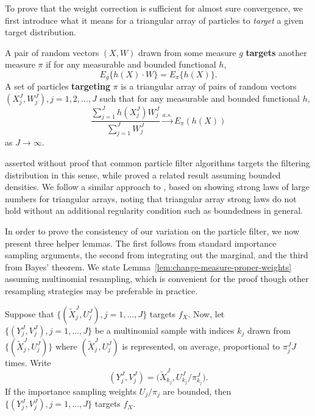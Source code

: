 To prove that the weight correction is sufficient for almost sure convergence, we first introduce what it means for a triangular array of particles to \textit{target} a given target distribution. 

\begin{defn}[Targeting]
    A pair of random vectors $(X, W)$ drawn from some measure $g$ \textbf{targets} another measure $\pi$ if for any measurable and bounded functional $h$,
\begin{equation}
    E_g\{h(X) \cdot W\}=E_\pi\{h(X)\}.
\end{equation}  
    A set of particles \textbf{targeting} $\pi$ is a triangular array of pairs of random vectors $(X^J_j, W^J_j), j=1,2, \ldots,J$ such that for any measurable and bounded functional $h$,
\begin{equation}
    \frac{\sum_{j=1}^J h(X^J_j) W^J_j}{\sum_{j=1}^J W^J_j} \stackrel{a.s.}{\to} E_\pi(h(X))
\end{equation}
as $J \to \infty$.
\end{defn}
\cite{chopin04} asserted without proof that common particle filter algorithms targets the filtering distribution in this sense, while \cite{chopin20} proved a related result assuming bounded densities.
We follow a similar approach to \cite{chopin20}, based on showing strong laws of large numbers for triangular arrays, noting that triangular array strong laws do not hold without an additional regularity condition such as boundedness in general.
 
In order to prove the consistency of our variation on the particle filter, we now present three helper lemmas.
The first follows from standard importance sampling arguments, the second from integrating out the marginal, and the third from Bayes' theorem. 
We state Lemma~\ref{lem:change-measure-proper-weights} assuming multinomial resampling, which is convenient for the proof though other resampling strategies may be preferable in practice.

\begin{lem}
    \label{lem:change-measure-proper-weights}
    Suppose that $\{(\tilde X_j^J,U_j^J),j=1,\dots,J\}$ targets $f_X$. Now, let $\{(Y_j^J,V_j^J),j=1,\dots,J\}$ be a multinomial sample with indices $k_j$ drawn from $\{(\tilde X_j^J,U_j^J)\}$ where $(\tilde X_j^J,U_j^J)$ is represented, on average, proportional to $\pi^J_j J$ times. Write
    \[
    (Y_j^J,V_j^J) = \big(\tilde X^J_{k_j},U^J_{k_j}/\pi^J_{k_j}\big).
    \] 
    If the importance sampling weights $U_j/\pi_j$ are bounded, then $\{(Y^J_j,V^J_j),j=1,\dots,J\}$ targets $f_X$.
\end{lem}

